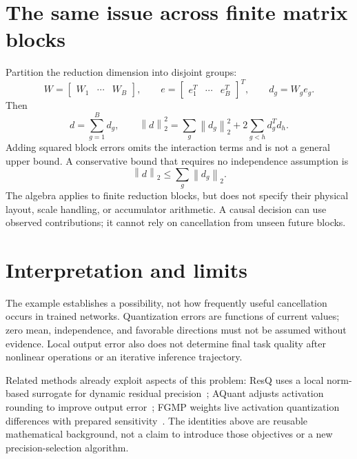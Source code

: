 \documentclass[10pt,a4paper]{article}
\newcommand{\norm}[1]{\left\lVert #1\right\rVert}
\begin{document}
\section{The same issue across finite matrix blocks}
Partition the reduction dimension into disjoint groups:
\begin{equation}
  W=\begin{bmatrix}W_1&\cdots&W_B\end{bmatrix},\qquad
  e=\begin{bmatrix}e_1^T&\cdots&e_B^T\end{bmatrix}^T,\qquad
  d_g=W_g e_g.
  \label{aed:blocks}
\end{equation}
Then
\begin{equation}
  d=\sum_{g=1}^B d_g,\qquad
  \norm{d}_2^2=\sum_g\norm{d_g}_2^2
                +2\sum_{g<h}d_g^Td_h.
  \label{aed:block-interactions}
\end{equation}
Adding squared block errors omits the interaction terms and is not a general
upper bound. A conservative bound that requires no independence assumption is
\begin{equation}
  \norm{d}_2\leq\sum_g\norm{d_g}_2.
  \label{aed:triangle-bound}
\end{equation}
The algebra applies to finite reduction blocks, but does not specify their
physical layout, scale handling, or accumulator arithmetic. A causal decision
can use observed contributions; it cannot rely on cancellation from unseen
future blocks.

\section{Interpretation and limits}
The example establishes a possibility, not how frequently useful cancellation
occurs in trained networks. Quantization errors are functions of current values;
zero mean, independence, and favorable directions must not be assumed without
evidence. Local output error also does not determine final task quality after
nonlinear operations or an iterative inference trajectory.

Related methods already exploit aspects of this problem: ResQ uses a local
norm-based surrogate for dynamic residual precision~\cite{resq}; AQuant adjusts
activation rounding to improve output error~\cite{aquant}; FGMP weights live
activation quantization differences with prepared sensitivity~\cite{fgmp}.
The identities above are reusable mathematical background, not a claim to
introduce those objectives or a new precision-selection algorithm.
\end{document}
